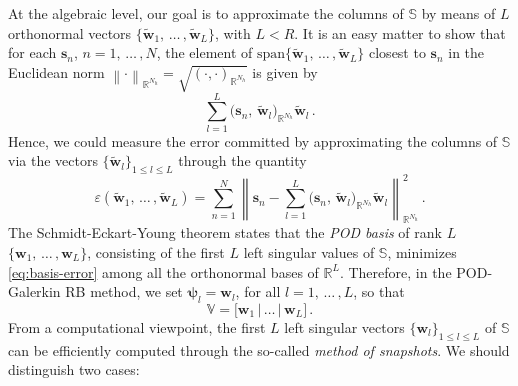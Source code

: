 \documentclass[longtitle]{elsarticle}
\numberwithin{equation}{section}
\theoremstyle{theorem}
\theoremstyle{definition}
\theoremstyle{remark}
\theoremstyle{proposition}
\numberwithin{figure}{section}
\newcommand{\norm}[1]{\left\lVert#1\right\rVert}
\newcommand{\wt}[1]{\widetilde{#1}}
\newcommand{\bg}[1]{\boldsymbol{#1}}
\begin{document}
		At the algebraic level, our goal is to approximate the columns of $\mathbb{S}$ by means of $L$ orthonormal vectors $\big\lbrace \wt{\mathbf{w}}_1, \, \ldots \, , \wt{\mathbf{w}}_L \big\rbrace$, with $L < R$. It is an easy matter to show that for each $\mathbf{s}_n$, $n = 1, \, \ldots \, , N$, the element of $\text{span} \big\lbrace \wt{\mathbf{w}}_1, \, \ldots \, , \wt{\mathbf{w}}_L \big\rbrace$ closest to $\mathbf{s}_n$ in the Euclidean norm $\norm{\cdot}_{\mathbb{R}^{N_h}} = \sqrt{(\cdot,\cdot)_{\mathbb{R}^{N_h}}}$ is given by
		\begin{equation*}
			\sum_{l = 1}^L \big( \mathbf{s}_n, \, \wt{\mathbf{w}}_l \big)_{\mathbb{R}^{N_h}} \wt{\mathbf{w}}_l \, .
		\end{equation*}
		Hence, we could measure the error committed by approximating the columns of $\mathbb{S}$ via the vectors $\big\lbrace \wt{\mathbf{w}}_l \big\rbrace_{1 \leq l \leq L}$ through the quantity
		\begin{equation}
			\label{eq:basis-error}
			\varepsilon(\wt{\mathbf{w}}_1, \, \ldots \, , \wt{\mathbf{w}}_L) = \sum_{n = 1}^N \norm{\mathbf{s}_n - \sum_{l = 1}^L \big( \mathbf{s}_n, \, \wt{\mathbf{w}}_l \big)_{\mathbb{R}^{N_h}} \wt{\mathbf{w}}_l}_{\mathbb{R}^{N_h}}^2 \, .
		\end{equation}
		The Schmidt-Eckart-Young theorem \cite{EY36, Sch07} states that the \emph{POD basis} of rank $L$ $\big\lbrace \mathbf{w}_1, \, \ldots \, , \mathbf{w}_L \big\rbrace$, consisting of the first $L$ left singular values of $\mathbb{S}$, minimizes \eqref{eq:basis-error} among all the orthonormal bases of $\mathbb{R}^L$. Therefore, in the POD-Galerkin RB method, we set $\bg{\psi}_l = \mathbf{w}_l$, for all $l = 1, \, \ldots \, , L$, so that
		\begin{equation*}
			\mathbb{V} = \big[ \mathbf{w}_1 \, \big| \, \ldots \, \big| \, \mathbf{w}_L \big] \, . 		
		\end{equation*}
		From a computational viewpoint, the first $L$ left singular vectors $\big\lbrace \mathbf{w}_l \big\rbrace_{1 \leq l \leq L}$ of $\mathbb{S}$ can be efficiently computed through the so-called \emph{method of snapshots}. We should distinguish two cases:
\end{document}
